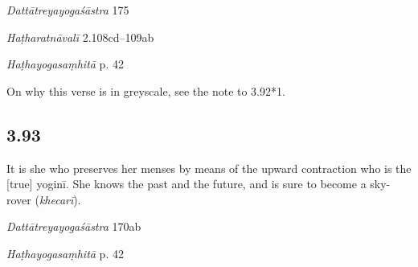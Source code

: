 \begin{ekdosis}
\begin{sources}[hp03_092_3]
\emph{Dattātreyayogaśāstra} 175
\begin{versinnote}
\end{versinnote}
\end{sources}

\begin{testimonia}[hp03_092_3]
\emph{Haṭharatnāvalī} 2.108cd--109ab
\begin{versinnote}
\end{versinnote}

\emph{Haṭhayogasaṃhitā} p. 42
\begin{versinnote}
\end{versinnote}
\end{testimonia}

\begin{philcomm}[hp03_092_3]
On why this verse is in greyscale, see the note to 3.92*1.
\end{philcomm}

\subsection*{3.93}
\begin{translation}[hp03_093]
It is she who preserves her menses by means of the upward contraction who is the [true] yoginī.
She knows the past and the future, and is sure to become a sky-rover (\emph{khecarī}).
\end{translation}

\begin{sources}[hp03_093]
\emph{Dattātreyayogaśāstra} 170ab
\begin{versinnote}
\end{versinnote}
\end{sources}

\begin{testimonia}[hp03_093]
\emph{Haṭhayogasaṃhitā} p. 42
\begin{versinnote}
\end{versinnote}


\end{testimonia}
\end{ekdosis}
